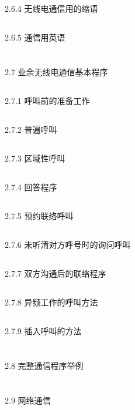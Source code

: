 \documentclass[12pt,UTF8]{ctexbook}
\begin{document}
\subsection{}2.6.4 无线电通信用的缩语
\subsection{}2.6.5 通信用英语
\section{}2.7 业余无线电通信基本程序
\subsection{}2.7.1 呼叫前的准备工作
\subsection{}2.7.2 普遍呼叫
\subsection{}2.7.3 区域性呼叫
\subsection{}2.7.4 回答程序
\subsection{}2.7.5 预约联络呼叫
\subsection{}2.7.6 未听清对方呼号时的询问呼叫
\subsection{}2.7.7 双方沟通后的联络程序
\subsection{}2.7.8 异频工作的呼叫方法
\subsection{}2.7.9 插入呼叫的方法
\section{}2.8 完整通信程序举例
\section{}2.9 网络通信
\end{document}
